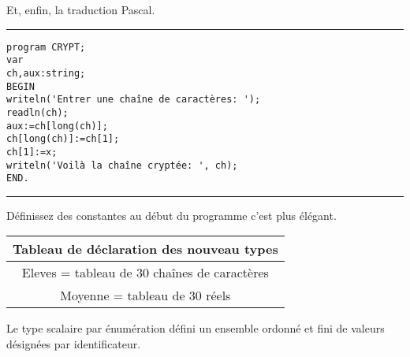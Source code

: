 \documentclass{article}
\begin{document}
Et, enfin, la traduction Pascal.
  \vspace{0.3cm}
  \hrule
  \vspace{0.3cm}
\begin{verbatim}
program CRYPT;
var
ch,aux:string;
BEGIN
writeln('Entrer une chaîne de caractères: ');
readln(ch);
aux:=ch[long(ch)];
ch[long(ch)]:=ch[1];
ch[1]:=x;
writeln('Voilà la chaîne cryptée: ', ch);
END.
\end{verbatim}
  \vspace{0.3cm}
  \hrule
  \vspace{0.3cm}

Définissez des constantes au début du programme c'est plus élégant.

\begin{tabular}{|c|}
	\hline
	Tableau de déclaration des nouveau types\\
	\hline\hline
	Eleves = tableau de 30 chaînes de caractères\\
	\hline
	Moyenne = tableau de 30 réels\\
	\hline
\end{tabular}


Le type scalaire par énumération défini un ensemble ordonné et fini de valeurs désignées par identificateur.
\end{document}
